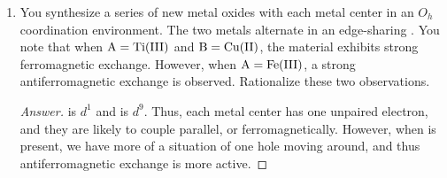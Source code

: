 \documentclass[../psets.tex]{subfiles}
\begin{document}
\begin{enumerate}
\begin{enumerate}
\begin{proof}[Answer]
        \end{proof}
    \end{enumerate}
    \item You synthesize a series of new metal oxides with each metal center in an $O_h$ coordination environment. The two metals alternate in an edge-sharing . You note that when $\ce{A}=\ce{Ti(III)}$ and $\ce{B}=\ce{Cu(II)}$, the material exhibits strong ferromagnetic exchange. However, when $\ce{A}=\ce{Fe(III)}$, a strong antiferromagnetic exchange is observed. Rationalize these two observations.
    \begin{proof}[Answer]
         is $d^1$ and  is $d^9$. Thus, each metal center has one unpaired electron, and they are likely to couple parallel, or ferromagnetically. However, when  is present, we have more of a situation of one hole moving around, and thus antiferromagnetic exchange is more active.
    \end{proof}
\end{enumerate}
\end{document}
